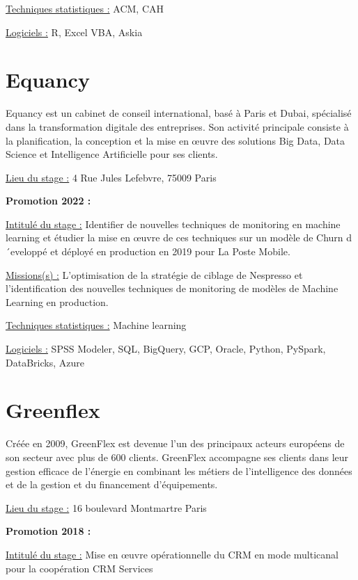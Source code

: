 \documentclass[
  letterpaper,
  DIV=11,
  numbers=noendperiod]{scrreprt}
\begin{document}
\uline{Techniques statistiques :} ACM, CAH

\uline{Logiciels :} R, Excel VBA, Askia

\hypertarget{equancy}{%
\section{\texorpdfstring{\textbf{Equancy}}{Equancy}}\label{equancy}}

Equancy est un cabinet de conseil international, basé à Paris et Dubai,
spécialisé dans la transformation digitale des entreprises. Son activité
principale consiste à la planification, la conception et la mise en
œuvre des solutions Big Data, Data Science et Intelligence Artificielle
pour ses clients.

\uline{Lieu du stage :} 4 Rue Jules Lefebvre, 75009 Paris

\textbf{Promotion 2022 :}

\uline{Intitulé du stage :} Identifier de nouvelles techniques de
monitoring en machine learning et étudier la mise en œuvre de ces
techniques sur un modèle de Churn d´eveloppé et déployé en production en
2019 pour La Poste Mobile.

\uline{Missions(s) :} L'optimisation de la stratégie de ciblage de
Nespresso et l'identification des nouvelles techniques de monitoring de
modèles de Machine Learning en production.

\uline{Techniques statistiques :} Machine learning

\uline{Logiciels :} SPSS Modeler, SQL, BigQuery, GCP, Oracle, Python,
PySpark, DataBricks, Azure

\hypertarget{greenflex}{%
\section{\texorpdfstring{\textbf{Greenflex}}{Greenflex}}\label{greenflex}}

Créée en 2009, GreenFlex est devenue l'un des principaux acteurs
européens de son secteur avec plus de 600 clients. GreenFlex accompagne
ses clients dans leur gestion efficace de l'énergie en combinant les
métiers de l'intelligence des données et de la gestion et du financement
d'équipements.

\uline{Lieu du stage :} 16 boulevard Montmartre Paris

\textbf{Promotion 2018 :}

\uline{Intitulé du stage :} Mise en œuvre opérationnelle du CRM en mode
multicanal pour la coopération CRM Services
\end{document}

